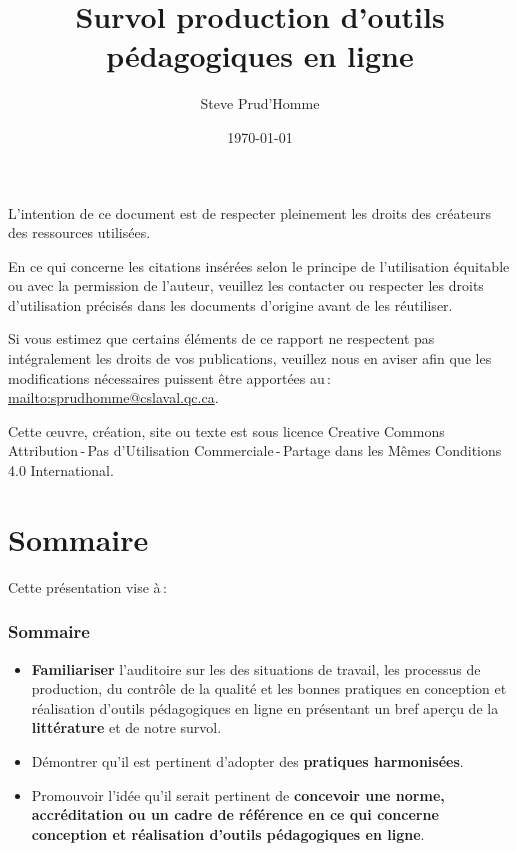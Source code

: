 	\title{Survol production d'outils pédagogiques en ligne} 
	\author{Steve Prud'Homme} 
	\date{\today} 

	
	
	\frame{\titlepage} 
	\usebackgroundtemplate{ } 
	\par L’intention de ce document est de respecter pleinement les droits des créateurs des ressources
utilisées.
	\par En ce qui concerne les citations insérées selon le principe de l'utilisation équitable ou avec la permission de l'auteur, veuillez les contacter ou respecter les droits d’utilisation précisés dans les documents d’origine avant de les réutiliser.
	\par Si vous estimez que certains éléments de ce rapport ne respectent pas intégralement les droits de vos
publications, veuillez nous en aviser afin que les modifications nécessaires puissent être apportées au\,: \url{mailto:sprudhomme@cslaval.qc.ca}.
	\par Cette \oe uvre, création, site ou texte est sous licence Creative Commons Attribution\,-\,Pas d’Utilisation Commerciale\,-\,Partage dans les Mêmes Conditions 4.0 International.
	\section{Sommaire} 
		\begin{frame}
			Cette présentation vise à\,:
			\frametitle{Sommaire}
			\begin {itemize}
				\item \textbf{Familiariser} l'auditoire sur les des situations de travail, les processus de production, 
du contrôle de la qualité et  les  bonnes pratiques en conception et réalisation d’outils pédagogiques en ligne en présentant un bref aperçu de la \textbf{littérature} et de notre survol.
				\item Démontrer qu'il est pertinent d'adopter des \textbf{pratiques harmonisées}.
				\item Promouvoir l'idée qu'il serait pertinent de \textbf{concevoir une norme, accréditation ou un cadre de référence en ce qui concerne conception et réalisation d’outils pédagogiques en ligne}.

			\end{itemize}
		\end{frame}


